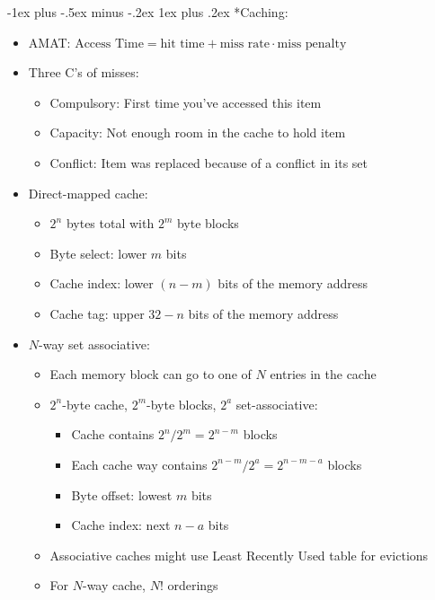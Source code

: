 \documentclass[landscape,10pt]{article}
\makeatletter
\renewcommand{\subsubsection}{\@startsection{subsubsection}{3}{0mm}%
            {-1ex plus -.5ex minus -.2ex}%
            {1ex plus .2ex}%
            {\normalfont\small\bfseries}}
\makeatother
\begin{document}
\begin{multicols}{4}
\subsubsection*{Caching:}
\begin{itemize}
    \item[] AMAT: \(\text{Access Time} = \text{hit time} + \text{miss rate} \cdot \text{miss penalty}\)
    \item[] Three C's of misses:
    \begin{itemize}
        \item[] Compulsory: First time you've accessed this item
        \item[] Capacity: Not enough room in the cache to hold item
        \item[] Conflict: Item was replaced because of a conflict in its set
    \end{itemize}
    \item[] Direct-mapped cache:
    \begin{itemize}
        \item[] \(2^n\) bytes total with \(2^m\) byte blocks
        \item[] Byte select: lower \(m\) bits
        \item[] Cache index: lower \((n-m)\) bits of the memory address
        \item[] Cache tag: upper \(32-n\) bits of the memory address
    \end{itemize}
    \item[] \(N\)-way set associative:
    \begin{itemize}
        \item[] Each memory block can go to one of \(N\) entries in the cache
        \item[] \(2^n\)-byte cache, \(2^m\)-byte blocks, \(2^a\) set-associative:
        \begin{itemize}
            \item[] Cache contains \(2^n/2^m = 2^{n-m}\) blocks
            \item[] Each cache way contains \(2^{n-m}/2^a = 2^{n-m-a}\) blocks
            \item[] Byte offset: lowest \(m\) bits
            \item[] Cache index: next \(n-a\) bits
        \end{itemize}
        \item[] Associative caches might use Least Recently Used table for evictions
        \item[] For \(N\)-way cache, \(N!\) orderings

\end{itemize}
\end{itemize}
\end{multicols}
\end{document}
